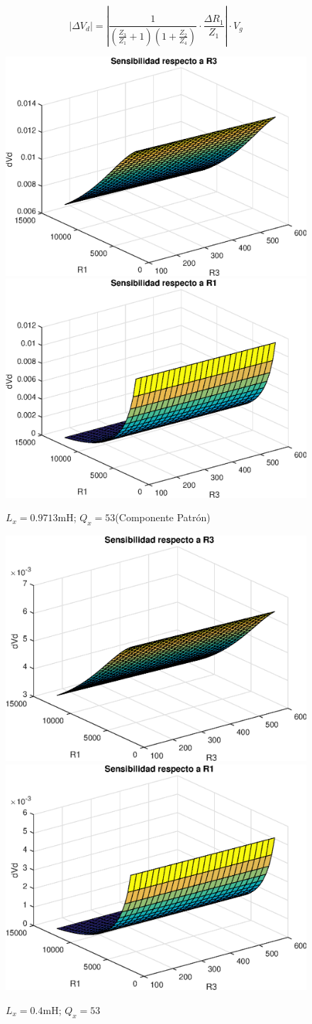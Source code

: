     \begin{equation}
        |\Delta V_d| = \left| \frac{1}{(\frac{Z_3}{Z_1}+1)(1+\frac{Z_2}{Z_4})} \cdot \frac{\Delta R_1}{Z_1} \right| \cdot V_g
        \label{eq:ej3dVdR1}
    \end{equation}

    \begin{figure}[ht!]
        \begin{center}
            \includegraphics[width=0.4\linewidth]{MATLAB/ej3dVd3}
            \includegraphics[width=0.4\linewidth]{MATLAB/ej3dVd1}
            \caption{$L_x=0.9713\si{\milli\henry}$; $Q_x=53$(Componente Patrón)}
            \label{fig:ej3dVd:patron}
        \end{center}
    \end{figure}

    \begin{figure}[ht!]
        \begin{center}
            \includegraphics[width=0.4\linewidth]{MATLAB/ej3dVd3min}
            \includegraphics[width=0.4\linewidth]{MATLAB/ej3dVd1min}
            \caption{$L_x=0.4\si{\milli\henry}$; $Q_x=53$}
            \label{fig:ej3dVd:min}
        \end{center}
    \end{figure}

